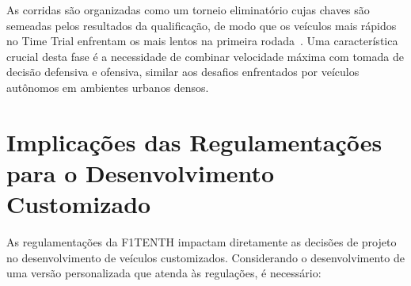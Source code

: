 As corridas são organizadas como um torneio eliminatório cujas chaves são
semeadas pelos resultados da qualificação, de modo que os veículos mais rápidos
no Time Trial enfrentam os mais lentos na primeira
rodada~\cite{F1TENTHRules2023}. Uma característica crucial desta fase é a
necessidade de combinar velocidade máxima com tomada de decisão defensiva e
ofensiva, similar aos desafios enfrentados por veículos autônomos em ambientes
urbanos densos.

\section{Implicações das Regulamentações para o Desenvolvimento Customizado}

As regulamentações da F1TENTH impactam diretamente as decisões de projeto no
desenvolvimento de veículos customizados. Considerando o desenvolvimento de uma
versão personalizada que atenda às regulações, é necessário:

